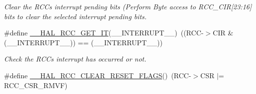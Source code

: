 \begin{DoxyCompactItemize}
\begin{DoxyCompactList}\small\item\em Clear the R\+CC\textquotesingle{}s interrupt pending bits (Perform Byte access to R\+C\+C\+\_\+\+C\+IR\mbox{[}23\+:16\mbox{]} bits to clear the selected interrupt pending bits. \end{DoxyCompactList}\item 
\#define \hyperlink{group___r_c_c___flags___interrupts___management_ga134af980b892f362c05ae21922cd828d}{\+\_\+\+\_\+\+H\+A\+L\+\_\+\+R\+C\+C\+\_\+\+G\+E\+T\+\_\+\+IT}(\+\_\+\+\_\+\+I\+N\+T\+E\+R\+R\+U\+P\+T\+\_\+\+\_\+)~((R\+CC-\/$>$C\+IR \& (\+\_\+\+\_\+\+I\+N\+T\+E\+R\+R\+U\+P\+T\+\_\+\+\_\+)) == (\+\_\+\+\_\+\+I\+N\+T\+E\+R\+R\+U\+P\+T\+\_\+\+\_\+))
\begin{DoxyCompactList}\small\item\em Check the R\+CC\textquotesingle{}s interrupt has occurred or not. \end{DoxyCompactList}\item 
\#define \hyperlink{group___r_c_c___flags___interrupts___management_gaf28c11b36035ef1e27883ff7ee2c46b0}{\+\_\+\+\_\+\+H\+A\+L\+\_\+\+R\+C\+C\+\_\+\+C\+L\+E\+A\+R\+\_\+\+R\+E\+S\+E\+T\+\_\+\+F\+L\+A\+GS}()~(R\+CC-\/$>$C\+SR $\vert$= R\+C\+C\+\_\+\+C\+S\+R\+\_\+\+R\+M\+VF)\hypertarget{group___r_c_c___flags___interrupts___management_gaf28c11b36035ef1e27883ff7ee2c46b0}{}\label{group___r_c_c___flags___interrupts___management_gaf28c11b36035ef1e27883ff7ee2c46b0}


\end{DoxyCompactItemize}
